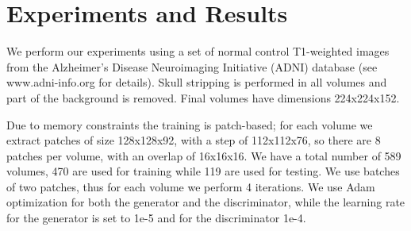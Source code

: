 \documentclass{article}
\begin{document}



\section{Experiments and Results}
\label{sec:expresults}

We perform our experiments using a set of normal control T1-weighted images from the Alzheimer’s Disease Neuroimaging Initiative (ADNI) database (see www.adni-info.org for details). Skull stripping is performed in all volumes and part of the background is removed. Final volumes have dimensions 224x224x152.

Due to memory constraints the training is patch-based; for each volume we extract patches of size 128x128x92, with a step of 112x112x76, so there are 8 patches per volume, with an overlap of 16x16x16. We have a total number of 589 volumes, 470 are used for training while 119 are used for testing. We use batches of two patches, thus for each volume we perform 4 iterations. We use Adam optimization for both the generator and the discriminator, while the learning rate for the generator is set to 1e-5 and for the discriminator 1e-4. 
\end{document}
